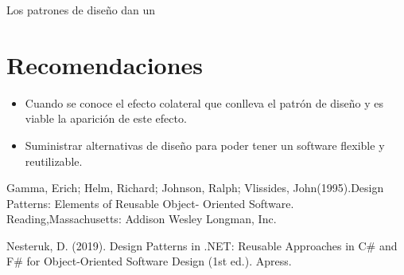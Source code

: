 \documentclass[twoside,twocolumn]{article}
\begin{document}
Los patrones de diseño dan un


\section{Recomendaciones}


\begin{itemize}
\item Cuando se conoce el efecto colateral que conlleva el patrón de diseño y es viable la aparición de este efecto.
\item Suministrar alternativas de diseño para poder tener un software flexible y reutilizable.

\end{itemize}




\begin{thebibliography}{99} 

\bibitem[1]{}
\newblock Gamma, Erich; Helm, Richard; Johnson, Ralph; Vlissides, John(1995).Design Patterns: Elements of Reusable Object- Oriented Software. Reading,Massachusetts: Addison Wesley Longman, Inc.

\bibitem[2]{}
\newblock Nesteruk, D. (2019). Design Patterns in .NET: Reusable Approaches in C# and F# for Object-Oriented Software Design (1st ed.). Apress.



\end{thebibliography}


\end{document}
